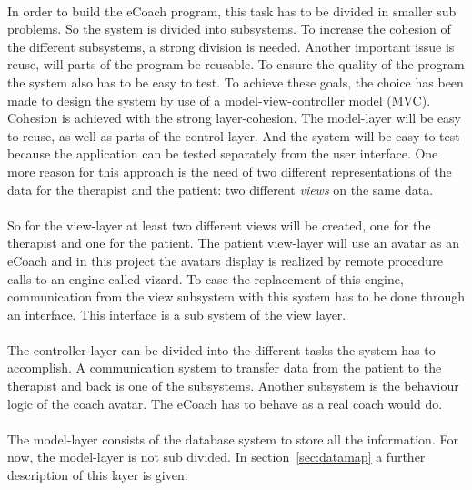 
\paragraph{}
In order to build the eCoach program, this task has to be divided in smaller sub problems. So the system is divided into subsystems. To increase the cohesion of the different subsystems, a strong division is needed. Another important issue is reuse, will parts of the program be reusable. To ensure the quality of the program the system also has to be easy to test. To achieve these goals, the choice has been made to design the system by use of a model-view-controller model (MVC). Cohesion is achieved  with the strong layer-cohesion. The model-layer will be easy to reuse, as well as parts of the control-layer. And the system will be easy to test because the application can be tested separately from the user interface. One more reason for this approach is the need of two different representations of the data for the therapist and the patient: two different \textit{views} on the same data.
\paragraph{}
So for the view-layer at least two different views will be created, one for the therapist and one for the patient. The patient view-layer will  use an avatar as an eCoach and in this project the avatars display is realized by remote procedure calls to an engine called vizard. To ease the replacement of this engine, communication from the view subsystem with this system has to be done through an interface. This interface is a sub system of the view layer.
\paragraph{}
The controller-layer can be divided into the different tasks the system has to accomplish. A communication system to transfer data from the patient to the therapist and back is one of the subsystems. Another subsystem is the behaviour logic of the coach avatar. The eCoach has to behave as a real coach would do. 
\paragraph{}
The model-layer consists of the database system to store all the information. For now, the model-layer is not sub divided. In section~\ref{sec:datamap} a further description of this layer is given.
